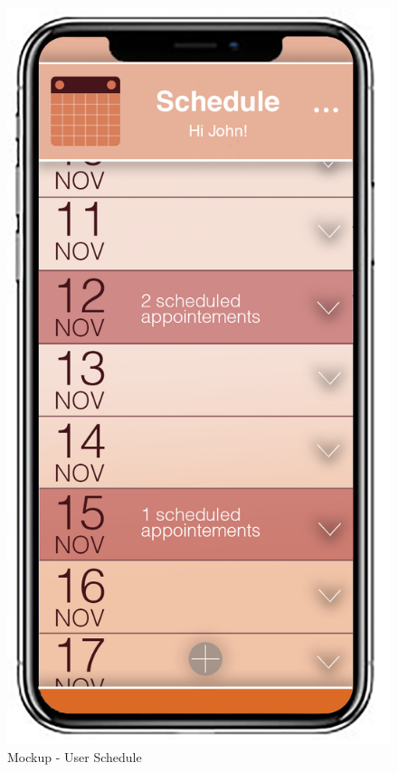 \begin{figure}[H]
\begin{minipage}{0.5\textwidth}
		\centerline{\includegraphics[width=0.3\paperwidth]{Images/UserSchedule}}
		\caption{Mockup - User Schedule}
	\end{minipage}
\end{figure}
